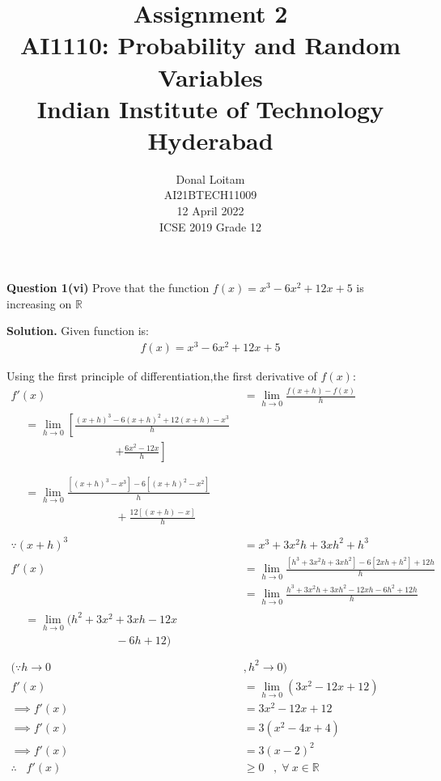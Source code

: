 \documentclass[journal,12pt,twocolumn]{IEEEtran}
\title{Assignment 2 \\ \Large AI1110: Probability and Random Variables \\ \large Indian Institute of Technology Hyderabad}
\author{Donal Loitam \\ \normalsize AI21BTECH11009 \\ \vspace*{20pt} \normalsize  12 April 2022 \\ \vspace*{20pt} \Large ICSE 2019 Grade 12}
\providecommand{\sbrak}[1]{\ensuremath{{}\left[#1\right]}}
\begin{document}
	\maketitle
	
	\textbf{Question 1(vi)} 
	Prove that the function $f(x)=x^3-6x^2+12x+5$ is increasing on $\mathbb{R}$
	
	\textbf{Solution.}
	Given function is:
  \begin{align}
      f(x)=x^3-6x^2+12x+5
  \end{align}
	
	Using the first principle of differentiation,the first derivative of $f(x)$:
  \begin{align}
	 f'(x)&=\lim_{h \to 0} \tfrac{f(x+h)-f(x)}{h} \\
    \begin{split}
           &=\lim_{h \to 0} \left[\tfrac{(x+h)^3 - 6(x+h)^2+12(x+h)-x^3}{h}\right.\\
	   &\hspace{8em}\left.+\tfrac{6x^2-12x}{h}\right]\\
     \end{split}\\
     \begin{split}
          &=\lim_{h \to 0} \tfrac{\sbrak{(x+h)^3-x^3}-6\sbrak{(x+h)^2-x^2}}{h}\\
	  & \hspace{8em}+\tfrac{12\sbrak{(x+h)-x}}{h} \\
      \end{split}\\
          \because(x+h)^3&=x^3+3x^2h+3xh^2+h^3\\
           f'(x)&=\lim_{h \to 0} \tfrac{\sbrak{h^3+3x^2h+3xh^2}-6\sbrak{2xh+h^2}+12h}{h} \\
                &=\lim_{h \to 0} \tfrac{h^3+3x^2h+3xh^2-12xh-6h^2+12h}{h} \\
       \begin{split}
	      &= \lim_{h \to 0} (h^2 + 3x^2 + 3xh - 12x \\
	      & \hspace{8em} - 6h + 12) \\
	\end{split} \\
    (\because{h \to 0}&,{h^2 \to 0})\\
             f'(x) &=\lim_{h \to 0} (3x^2-12x+12) \\ 
     \implies f'(x)&=3x^2-12x+12\\ 
     \implies f'(x)&=3(x^2-4x+4) \\
     \implies f'(x)&=3(x-2)^2 \\
    \therefore\;\;\;  f'(x)&\ge0 \;\;\;,\;\forall ~x \in \mathbb{R}
  \end{align}
	
\end{document}
